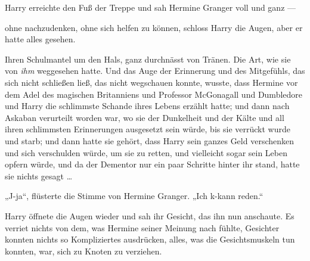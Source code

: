 Harry erreichte den Fuß der Treppe und sah Hermine Granger voll und ganz —

ohne nachzudenken, ohne sich helfen zu können, schloss Harry die Augen, aber er hatte alles gesehen.



Ihren Schulmantel um den Hals, ganz durchnässt von Tränen. Die Art, wie sie von \emph{ihm} weggesehen hatte. Und das Auge der Erinnerung und des Mitgefühls, das sich nicht schließen ließ, das nicht wegschauen konnte, wusste, dass Hermine vor dem Adel des magischen Britanniens und Professor McGonagall und Dumbledore und Harry die schlimmste Schande ihres Lebens erzählt hatte; und dann nach Askaban verurteilt worden war, wo sie der Dunkelheit und der Kälte und all ihren schlimmsten Erinnerungen ausgesetzt sein würde, bis sie verrückt wurde und starb; und dann hatte sie gehört, dass Harry sein ganzes Geld verschenken und sich verschulden würde, um sie zu retten, und vielleicht sogar sein Leben opfern würde, und da der Dementor nur ein paar Schritte hinter ihr stand, hatte sie nichts gesagt …

„J-ja“, flüsterte die Stimme von Hermine Granger.
„Ich k-kann reden.“

Harry öffnete die Augen wieder und sah ihr Gesicht, das ihn nun anschaute. Es verriet nichts von dem, was Hermine seiner Meinung nach fühlte, Gesichter konnten nichts so Kompliziertes ausdrücken, alles, was die Gesichtsmuskeln tun konnten, war, sich zu Knoten zu verziehen.

